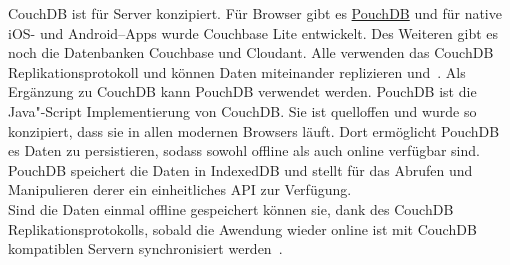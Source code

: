 CouchDB ist für Server konzipiert. Für Browser gibt es \hyperref[sub:pouch]{PouchDB} und für native iOS- und Android--\glspl{App} wurde Couchbase Lite entwickelt.
Des Weiteren gibt es noch die Datenbanken Couchbase und Cloudant.
Alle verwenden das CouchDB Replikationsprotokoll und können Daten miteinander replizieren und~\cite{couch}.
%
%
Als Ergänzung zu CouchDB kann PouchDB verwendet werden. PouchDB ist die Java"-Script Implementierung von CouchDB.
Sie ist quelloffen und wurde so konzipiert, dass sie in allen modernen Browsers läuft. Dort ermöglicht PouchDB es Daten zu persistieren, sodass sowohl offline als auch online verfügbar sind.
PouchDB speichert die Daten in IndexedDB und stellt für das Abrufen und Manipulieren derer ein einheitliches \gls{API} zur Verfügung.\\
Sind die Daten einmal offline gespeichert können sie, dank des CouchDB Replikationsprotokolls, sobald die Awendung wieder online ist mit CouchDB kompatiblen Servern synchronisiert werden~\cite{pouch}.
